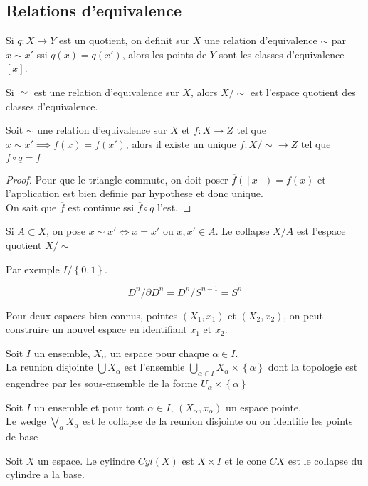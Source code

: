 \message{ !name(lec1.tex)}\documentclass[../main.tex]{subfiles}
\begin{document}
\subsection{Relations d'equivalence}
Si $q:X\to Y$ est un quotient, on definit sur $X$ une relation d'equivalence $\sim $ par $x\sim x'$ ssi $q( x) =q( x') $, alors les points de $Y$ sont les classes d'equivalence $[x]$.\\
\begin{defn}
	Si $\simeq$ est une relation d'equivalence sur $X$, alors $X /\sim$ est l'espace quotient des classes d'equivalence.
\end{defn}
\begin{propo}
	
Soit $\sim$ une relation d'equivalence sur $X$ et $f:X\to Z$ tel que $x\sim x' \implies f( x) =f( x') $, alors il existe un unique $ \overline{f}: X /\sim \to Z$ tel que $ \overline{f}\circ q = f$ 
\end{propo}
\begin{proof}
Pour que le triangle commute, on doit poser $\overline{f}( [ x] ) = f( x) $ et l'application est bien definie par hypothese et donc unique.\\
On sait que $\overline{f}$ est continue ssi $\overline{f}\circ q $ l'est.
\end{proof}
\begin{defn}
	Si $A \subset X$, on pose $x\sim x' \iff x=x'$ ou $x,x' \in A$. Le collapse $X /A$ est l'espace quotient $X /\sim$ 
\end{defn}
Par exemple $I / \left\{ 0,1 \right\} $.
\begin{exemple}
\[ 
D^{n} /\partial D^{n}= D^{n} /S^{n-1}= S^{n}
\]


\end{exemple}
Pour deux espaces bien connus, pointes $( X_1,x_1) $ et $( X_2,x_2) $, on peut construire un nouvel espace en identifiant $x_1$ et $x_2$.\\
\begin{defn}
	Soit $I$ un ensemble, $X_\alpha$ un espace pour chaque $\alpha\in I$.\\
	La reunion disjointe $\bigcup X_\alpha$ est l'ensemble $\bigcup_{\alpha\in I} X_\alpha\times \left\{ \alpha \right\} $ dont la topologie est engendree par les sous-ensemble de la forme $U_\alpha\times \left\{ \alpha \right\} $ 
\end{defn}
\begin{defn}
Soit $I$ un ensemble et pour tout $\alpha \in I$, $( X_\alpha,x_\alpha) $ un espace pointe.\\
Le wedge $\bigvee_\alpha X_\alpha$ est le collapse de la reunion disjointe ou on identifie les points de base
\end{defn}
\begin{defn}
	Soit $X$ un espace. Le cylindre $Cyl( X)$ est $X\times I$ et le cone $CX$ est le collapse du cylindre a la base.
\end{defn}
\end{document}
